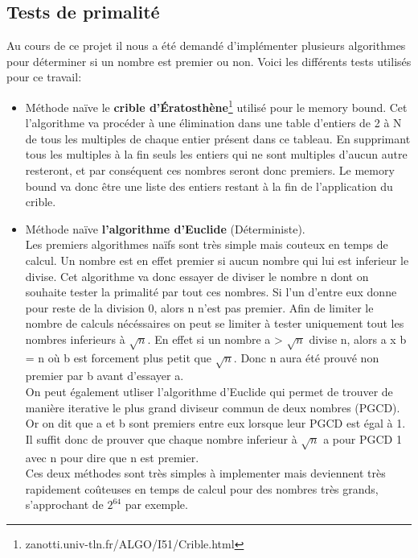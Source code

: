 		\subsection{Tests de primalité}
		Au cours de ce projet il nous a été demandé d'implémenter plusieurs algorithmes pour déterminer si un nombre est premier ou non. Voici les différents tests utilisés pour ce travail:
		\begin{itemize}
			\item Méthode naïve le \textbf{crible d’Ératosthène}\footnote{zanotti.univ-tln.fr/ALGO/I51/Crible.html} utilisé pour le memory bound. Cet l'algorithme va procéder à une élimination dans une table d'entiers de 2 à N de tous les multiples de chaque entier présent dans ce tableau. En supprimant tous les multiples à la fin seuls les entiers qui ne sont multiples d'aucun autre resteront, et par conséquent ces nombres seront donc premiers. Le memory bound va donc être une liste des entiers restant à la fin de l'application du crible.\\
			
			\item Méthode naïve \textbf{l'algorithme d'Euclide} (Déterministe).\\ Les premiers algorithmes naïfs sont très simple mais couteux en temps de calcul. Un nombre est en effet premier si aucun nombre qui lui est inferieur le divise. Cet algorithme va donc essayer de diviser le nombre n dont on souhaite tester la primalité par tout ces nombres. Si l'un d'entre eux donne pour reste de la division 0, alors n n'est pas premier. Afin de limiter le nombre de calculs nécéssaires on peut se limiter à tester uniquement tout les nombres inferieurs à $\sqrt{n}$. En effet si un nombre a > $\sqrt{n}$ divise n, alors a x b = n où b est forcement plus petit que $\sqrt{n}$. Donc n aura été prouvé non premier par b avant d'essayer a.\\
On peut également utliser l'algorithme d'Euclide qui permet de trouver de manière iterative le plus grand diviseur commun de deux nombres (PGCD). Or on dit que a et b sont premiers entre eux lorsque leur PGCD est égal à 1. Il suffit donc de prouver que chaque nombre inferieur à $\sqrt{n}$ a pour PGCD 1 avec n pour dire que n est premier.
\\
Ces deux méthodes sont très simples à implementer mais deviennent très rapidement coûteuses en temps de calcul pour des nombres très grands, s'approchant de $2^{64}$ par exemple.\\
			

\end{itemize}
